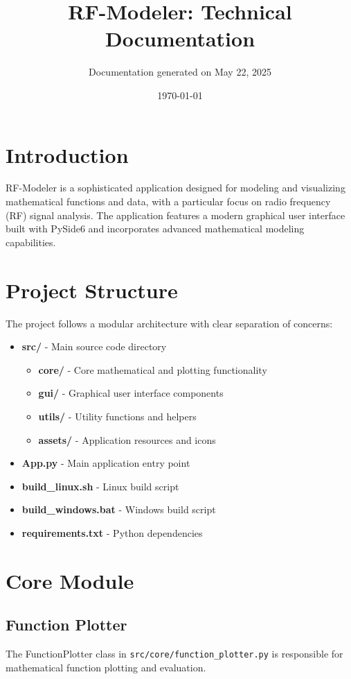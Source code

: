 \documentclass[12pt,a4paper]{report}
\title{RF-Modeler: Technical Documentation}
\author{Documentation generated on May 22, 2025}
\date{\today}
\begin{document}
\maketitle
\tableofcontents

\chapter{Introduction}
RF-Modeler is a sophisticated application designed for modeling and visualizing mathematical functions and data, with a particular focus on radio frequency (RF) signal analysis. The application features a modern graphical user interface built with PySide6 and incorporates advanced mathematical modeling capabilities.

\chapter{Project Structure}
The project follows a modular architecture with clear separation of concerns:

\begin{itemize}
    \item \textbf{src/} - Main source code directory
    \begin{itemize}
        \item \textbf{core/} - Core mathematical and plotting functionality
        \item \textbf{gui/} - Graphical user interface components
        \item \textbf{utils/} - Utility functions and helpers
        \item \textbf{assets/} - Application resources and icons
    \end{itemize}
    \item \textbf{App.py} - Main application entry point
    \item \textbf{build\_linux.sh} - Linux build script
    \item \textbf{build\_windows.bat} - Windows build script
    \item \textbf{requirements.txt} - Python dependencies
\end{itemize}

\chapter{Core Module}
\section{Function Plotter}
The FunctionPlotter class in \texttt{src/core/function\_plotter.py} is responsible for mathematical function plotting and evaluation.
\end{document}
